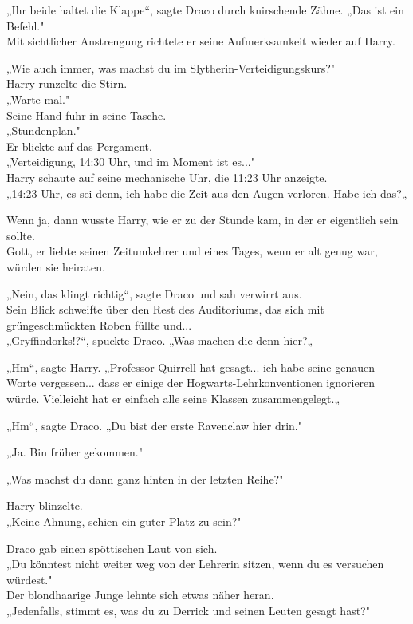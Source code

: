 {„Ihr beide haltet die Klappe“, sagte Draco durch knirschende Zähne. „Das ist ein Befehl."\\ Mit sichtlicher Anstrengung richtete er seine Aufmerksamkeit wieder auf Harry.

„Wie auch immer, was machst du im Slytherin-Verteidigungskurs?"\\ Harry runzelte die Stirn.\\ „Warte mal."\\ Seine Hand fuhr in seine Tasche.\\ „Stundenplan."\\ Er blickte auf das Pergament.\\ „Verteidigung, 14:30 Uhr, und im Moment ist es..."\\ Harry schaute auf seine mechanische Uhr, die 11:23 Uhr anzeigte.\\ „14:23 Uhr, es sei denn, ich habe die Zeit aus den Augen verloren. Habe ich das?„

Wenn ja, dann wusste Harry, wie er zu der Stunde kam, in der er eigentlich sein sollte.\\ Gott, er liebte seinen Zeitumkehrer und eines Tages, wenn er alt genug war, würden sie heiraten.

„Nein, das klingt richtig“, sagte Draco und sah verwirrt aus.\\ Sein Blick schweifte über den Rest des Auditoriums, das sich mit grüngeschmückten Roben füllte und...\\ „Gryffindorks!?“, spuckte Draco. „Was machen die denn hier?„

„Hm“, sagte Harry. „Professor Quirrell hat gesagt... ich habe seine genauen Worte vergessen... dass er einige der Hogwarts-Lehrkonventionen ignorieren würde. Vielleicht hat er einfach alle seine Klassen zusammengelegt.„

„Hm“, sagte Draco. „Du bist der erste Ravenclaw hier drin."

„Ja. Bin früher gekommen."

„Was machst du dann ganz hinten in der letzten Reihe?"

Harry blinzelte.\\ „Keine Ahnung, schien ein guter Platz zu sein?"

Draco gab einen spöttischen Laut von sich.\\ „Du könntest nicht weiter weg von der Lehrerin sitzen, wenn du es versuchen würdest."\\ Der blondhaarige Junge lehnte sich etwas näher heran.\\ „Jedenfalls, stimmt es, was du zu Derrick und seinen Leuten gesagt hast?"

}
